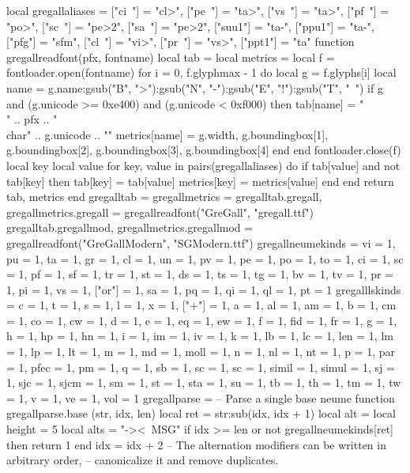 \usepackage{luacode}
\newfontface{}
\newfontface{}
\begin{luacode*}
local gregallaliases = {
["ci~"] = "cl>",
["pe~"] = "ta>",
["vs~"] = "ta>",
["pf~"] = "po>",
["sc~"] = "pe>2",
["sa~"] = "pe>2",
["suu1"] = "ta-",
["ppu1"] = "ta-",
["pfg"] = "sfm",
["cl~"] = "vi>",
["pr~"] = "vs>",
["ppt1"] = "ta" }
function gregallreadfont(pfx, fontname)
  local tab = {}
  local metrics = {}
  local f = fontloader.open(fontname)
  for i = 0, f.glyphmax - 1 do
    local g = f.glyphs[i]
    local name = g.name:gsub("B", ">"):gsub("N", "-"):gsub("E", "!"):gsub("T", "~")
    if g and (g.unicode >= 0xe400) and (g.unicode < 0xf000) then
      tab[name] = "{\\" .. pfx .. "\\char" .. g.unicode .. "}"
      metrics[name] = { g.width, g.boundingbox[1], g.boundingbox[2], g.boundingbox[3], g.boundingbox[4] }
    end
  end
  fontloader.close(f)
  local key
  local value
  for key, value in pairs(gregallaliases) do
    if tab[value] and not tab[key] then
      tab[key] = tab[value]
      metrics[key] = metrics[value]
    end
  end
  return tab, metrics
end
gregalltab = {}
gregallmetrics = {}
gregalltab.gregall, gregallmetrics.gregall = gregallreadfont("GreGall", "gregall.ttf")
gregalltab.gregallmod, gregallmetrics.gregallmod = gregallreadfont("GreGallModern", "SGModern.ttf")
gregallneumekinds = { vi = 1, pu = 1, ta = 1, gr = 1, cl = 1, un = 1, pv = 1, pe = 1, po = 1, to = 1, ci = 1, sc = 1, pf = 1, sf = 1, tr = 1,
		      st = 1, ds = 1, ts = 1, tg = 1, bv = 1, tv = 1, pr = 1, pi = 1, vs = 1, ["or"] = 1, sa = 1, pq = 1, qi = 1, ql = 1, pt = 1 }
gregalllskinds = { c = 1, t = 1, s = 1, l = 1, x = 1, ["+"] = 1, a = 1, al = 1, am = 1, b = 1, cm = 1, co = 1, cw = 1, d = 1, e = 1, eq = 1,
		   ew = 1, f = 1, fid = 1, fr = 1, g = 1, h = 1, hp = 1, hn = 1, i = 1, im = 1, iv = 1, k = 1, lb = 1, lc = 1, len = 1,
		   lm = 1, lp = 1, lt = 1, m = 1, md = 1, moll = 1, n = 1, nl = 1, nt = 1, p = 1, par = 1, pfec = 1, pm = 1, q = 1,
		   sb = 1, sc = 1, sc = 1, simil = 1, simul = 1, sj = 1, sjc = 1, sjcm = 1, sm = 1, st = 1, sta = 1, su = 1, tb = 1,
		   th = 1, tm = 1, tw = 1, v = 1, ve = 1, vol = 1 }
gregallparse = {}
-- Parse a single base neume
function gregallparse.base (str, idx, len)
  local ret = str:sub(idx, idx + 1)
  local alt = {}
  local height = 5
  local alts = "-><~MSG"
  if idx >= len or not gregallneumekinds[ret] then return 1 end
  idx = idx + 2
  -- The alternation modifiers can be written in arbitrary order,
  -- canonicalize it and remove duplicates.

\end{luacode*}
